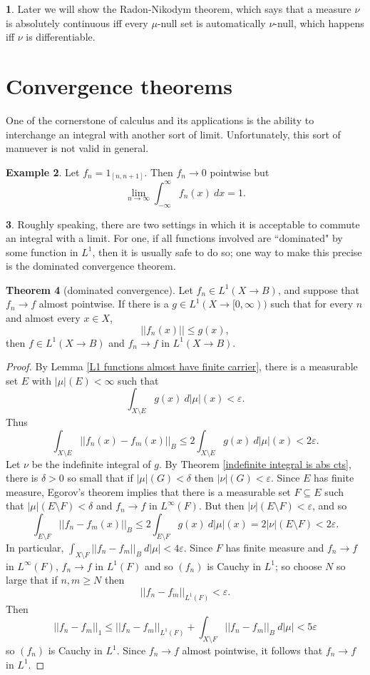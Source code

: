 \documentclass[12pt]{book}
\theoremstyle{definition}
\newtheorem{theorem}{Theorem}[section]
\newtheorem{subsec}[theorem]{}
\newtheorem{example}[theorem]{Example}
\begin{document}
\begin{subsec}
Later we will show the Radon-Nikodym theorem, which says that a measure $\nu$ is absolutely continuous iff every $\mu$-null set is automatically $\nu$-null, which happens iff $\nu$ is differentiable.
\end{subsec}


\section{Convergence theorems}
One of the cornerstone of calculus and its applications is the ability to interchange an integral with another sort of limit.
Unfortunately, this sort of manuever is not valid in general.

\begin{example}
Let $f_n = 1_{[n, n + 1]}$. Then $f_n \to 0$ pointwise but
$$\lim_{n \to \infty} \int_{-\infty}^\infty f_n(x) ~dx = 1.$$
\end{example}

\begin{subsec}
Roughly speaking, there are two settings in which it is acceptable to commute an integral with a limit.
For one, if all functions involved are ``dominated" by some function in $L^1$, then it is usually safe to do so; one way to make this precise is the dominated convergence theorem.
\end{subsec}

\begin{theorem}[dominated convergence]
Let $f_n \in L^1(X \to B)$, and suppose that $f_n \to f$ almost pointwise. If there is a $g \in L^1(X \to [0, \infty))$ such that for every $n$ and almost every $x \in X$,
$$||f_n(x)|| \leq g(x),$$
then $f \in L^1(X \to B)$ and $f_n \to f$ in $L^1(X \to B)$.
\end{theorem}
\begin{proof}
By Lemma \ref{L1 functions almost have finite carrier}, there is a measurable set $E$ with $|\mu|(E) < \infty$ such that
$$\int_{X \setminus E} g(x) ~d|\mu|(x) < \varepsilon.$$
Thus
$$\int_{X \setminus E} ||f_n(x) - f_m(x)||_B \leq 2\int_{X \setminus E} g(x) ~d|\mu|(x) < 2\varepsilon.$$
Let $\nu$ be the indefinite integral of $g$.
By Theorem \ref{indefinite integral is abs cts}, there is $\delta > 0$ so small that if $|\mu|(G) < \delta$ then $|\nu|(G) < \varepsilon$.
Since $E$ has finite measure, Egorov's theorem implies that there is a measurable set $F \subseteq E$ such that $|\mu|(E \setminus F) < \delta$ and $f_n \to f$ in $L^\infty(F)$.
But then $|\nu|(E \setminus F) < \varepsilon$, and so
$$\int_{E \setminus F} ||f_n - f_m(x)||_B \leq 2\int_{E \setminus F} g(x) ~d|\mu|(x) = 2|\nu|(E \setminus F) < 2\varepsilon.$$
In particular, $\int_{X \setminus F} ||f_n - f_m||_B ~d|\mu| < 4\varepsilon$.
Since $F$ has finite measure and $f_n \to f$ in $L^\infty(F)$, $f_n \to f$ in $L^1(F)$ and so $(f_n)$ is Cauchy in $L^1$; so choose $N$ so large that if $n,m \geq N$ then
$$||f_n - f_m||_{L^1(F)} < \varepsilon.$$
Then
$$||f_n - f_m||_1 \leq ||f_n - f_m||_{L^1(F)} + \int_{X \setminus F} ||f_n - f_m||_B ~d|\mu| < 5\varepsilon$$
so $(f_n)$ is Cauchy in $L^1$.
Since $f_n \to f$ almost pointwise, it follows that $f_n \to f$ in $L^1$.
\end{proof}
\end{document}
